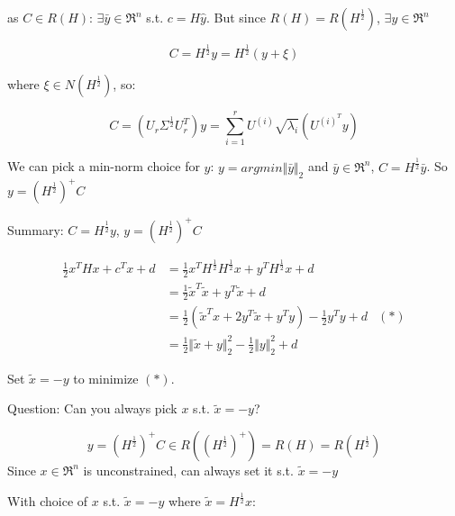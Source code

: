 as $C\in R(H)$: $\exists \bar{y}\in \Re^n$ s.t. $c = H\hat{y}$. But since $R(H) = R(H^{\frac{1}{2}})$, $\exists y \in \Re^n$

\begin{equation*}
C = H^{\frac{1}{2}}y = H^{\frac{1}{2}}(y+\xi)
\end{equation*}

where $\xi \in N(H^{\frac{1}{2}})$, so:

\begin{equation*}
C = (U_r\Sigma^{\frac{1}{2}}U_r^T)y = \sum^r_{i=1}U^{(i)}\sqrt{\lambda_i}(U^{(i)^T}y)
\end{equation*}

We can pick a min-norm choice for $y$: $y = argmin\Vert \bar{y}\Vert_2$ and $\bar{y}\in\Re^n$, $C = H^{\frac{1}{2}}\bar{y}$. So $y = (H^{\frac{1}{2}})^+C$

Summary: $C = H^{\frac{1}{2}}y$, $y = (H^{\frac{1}{2}})^+C$

\begin{align*}
\frac{1}{2}x^THx + c^Tx + d &= \frac{1}{2}x^TH^{\frac{1}{2}}H^{\frac{1}{2}}x+y^TH^{\frac{1}{2}}x + d\\
&= \frac{1}{2}\tilde{x}^T\tilde{x} + y^T\tilde{x} + d\\
&= \frac{1}{2}(\tilde{x}^Tx+2y^T\tilde{x}+y^Ty) - \frac{1}{2}y^Ty + d &(*)\\
&= \frac{1}{2}\Vert\tilde{x}+y\Vert^2_2 - \frac{1}{2}\Vert y \Vert^2_2 + d
\end{align*}

Set $\tilde{x} = -y$ to minimize $(*)$.

Question: Can you always pick $x$ s.t. $\tilde{x} = -y$?

\begin{equation*}
y = (H^{\frac{1}{2}})^+C\in R((H^{\frac{1}{2}})^+) = R(H) = R(H^{\frac{1}{2}})
\end{equation*}
Since $x\in \Re^n$ is unconstrained, can always set it s.t. $\tilde{x} = -y$ 

With choice of $x$ s.t. $\tilde{x} = -y$ where $\tilde{x} = H^{\frac{1}{2}}x$:


